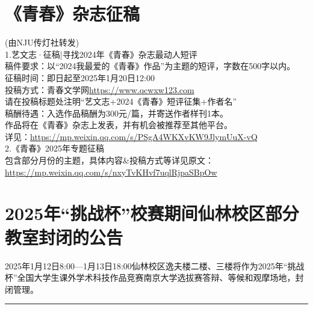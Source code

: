 \documentclass[letterpaper, 12pt]{article}
\begin{document}
\begin{multicols}{2}
\section{《青春》杂志征稿}
(由NJU传灯社转发)\\
1.艺文志·征稿|寻找2024年《青春》杂志最动人短评\\
稿件要求：以“2024我最爱的《青春》作品”为主题的短评，字数在500字以内。\\
征稿时间：即日起至2025年1月20日12:00\\
投稿方式：青春文学网\url{https://www.qcwxw123.com}\\
请在投稿标题处注明“艺文志+2024《青春》短评征集+作者名”\\
稿酬待遇：入选作品稿酬为300元/篇，并寄送作者样刊1本。\\
作品将在《青春》杂志上发表，并有机会被推荐至其他平台。\\
详见：\url{https://mp.weixin.qq.com/s/PSgA4WKXvKW9JlymUuX-vQ}\\
2.《青春》2025年专题征稿\\
包含部分月份的主题，具体内容\&投稿方式等详见原文：\url{https://mp.weixin.qq.com/s/nxyTvKHvf7uqlRjpaSBpOw}

\section{2025年“挑战杯”校赛期间仙林校区部分教室封闭的公告}
2025年1月12日8:00—1月13日18:00仙林校区逸夫楼二楼、三楼将作为2025年“挑战杯”全国大学生课外学术科技作品竞赛南京大学选拔赛答辩、等候和观摩场地，封闭管理。

\end{multicols} 
\hrule
\vspace{4mm}
\end{document}
